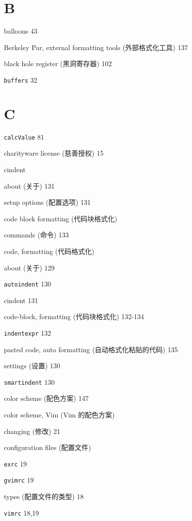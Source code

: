 \begin{multicols}{2}
\section*{B}

balloons 43

Berkeley Par, external formatting tools (外部格式化工具) 137

black hole register (黑洞寄存器) 102

\texttt{buffers} 32

\section*{C}

\texttt{calcValue} 81

charityware license (慈善授权) 15

cindent \par
  about (关于) 131 \par
  setup options (配置选项) 131 \par

code block formatting (代码块格式化) \par
  commands (命令) 133 \par

code, formatting (代码格式化) \par
  about (关于) 129 \par
  \texttt{autoindent} 130 \par
  cindent 131 \par
  code-block, formatting (代码块格式化) 132-134 \par
  \texttt{indentexpr} 132 \par
  pasted code, auto formatting (自动格式化粘贴的代码) 135 \par
  settings (设置) 130 \par
  \texttt{smartindent} 130 \par

color scheme (配色方案) 147

color scheme, Vim (Vim 的配色方案) \par
  changing (修改) 21 \par

configuration files (配置文件) \par
  \texttt{exrc} 19 \par
  \texttt{gvimrc} 19 \par
  types (配置文件的类型) 18 \par
  \texttt{vimrc} 18,19 \par


\end{multicols}
